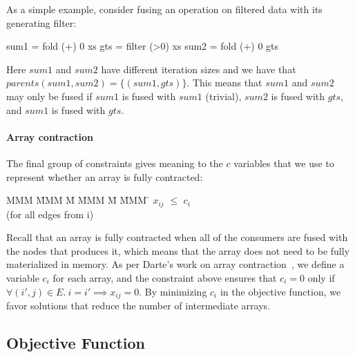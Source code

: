 As a simple example, consider fusing an operation on filtered data with its generating filter:
\begin{code}
    sum1 = fold (+) 0  xs
    gts  = filter (>0) xs
    sum2 = fold (+) 0  gts
\end{code}
Here $sum1$ and $sum2$ have different iteration sizes and we have that $parents(sum1, sum2) = \{(sum1, gts)\}$. This means that $sum1$ and $sum2$ may only be fused if $sum1$ is fused with $sum1$ (trivial), $sum2$ is fused with $gts$, and $sum1$ is fused with $gts$.




\paragraph{Array contraction} The final group of constraints gives meaning to the $c$ variables that we use to represent whether an array is fully contracted:
\begin{tabbing}
MMM     \= MMM \= M \= MMM \= M \= MMM \= \kill
        \> $x_{ij}$    \> $\le$ \> $c_i$  \> \> \\
        \> (for all edges from i)
\end{tabbing}
Recall that an array is fully contracted when all of the consumers are fused with the nodes that produces it, which means that the array does not need to be fully materialized in memory. As per Darte's work on array contraction~\cite{darte2002contraction}, we define a variable $c_i$ for each array, and the constraint above ensures that $c_i = 0$ only if $\forall (i',j) \in E.\ i = i' \implies x_{ij} = 0$. By minimizing $c_i$ in the objective function, we favor solutions that reduce the number of intermediate arrays.


\subsection{Objective Function}
\label{s:ObjectiveFunction}

